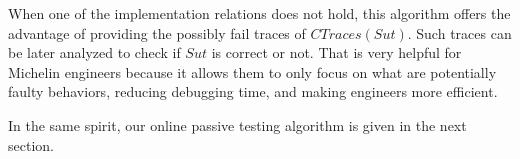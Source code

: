 When one of the implementation relations does not hold, this
algorithm offers the advantage of providing the possibly fail
traces of $CTraces({Sut})$. Such traces can be later analyzed to
check if $\mathit{Sut}$ is correct or not. That is very helpful
for Michelin engineers because it allows them to only focus on
what are potentially faulty behaviors, reducing debugging time,
and making engineers more efficient.

In the same spirit, our online passive testing algorithm is given
in the next section.
